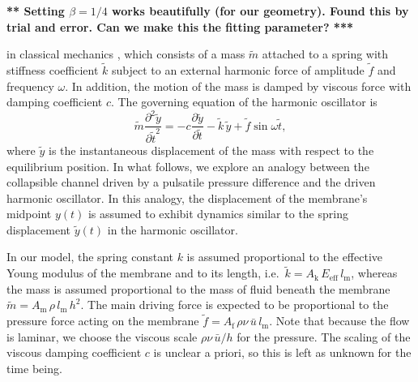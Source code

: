\documentclass[aps,prl,reprint,superscriptaddress,floatfix]{revtex4-1}
\begin{document}
{\bf *** Setting $\beta =  1/4$ works beautifully (for our geometry).
  Found this by trial and error. Can we make this the fitting
  parameter? ***}
\newpage



in classical mechanics \cite{Shabana91}, which consists of a mass $\widetilde{m}$ attached to a spring with stiffness coefficient $\widetilde{k}$ subject to an external harmonic force of amplitude $\widetilde f$ and frequency $\omega$. In addition, the motion of the mass is damped by viscous force with damping coefficient $c$. The governing equation of the harmonic oscillator is
\begin{equation}
\widetilde m\frac{\partial^2 \widetilde y}{\partial {\widetilde t}^2}=-c\frac{\partial \widetilde y}{\partial \widetilde t}-\widetilde k\,\widetilde y+\widetilde f\sin  \omega \widetilde t,
\label{eq:oscillator_eqn}
\end{equation}	
where $\widetilde y$ is the instantaneous displacement of the mass with respect to the equilibrium position. In what follows, we explore an analogy between the collapsible channel driven by a pulsatile pressure difference and the driven harmonic oscillator. In this analogy, the displacement of the membrane's midpoint $y(t)$ is assumed to exhibit dynamics similar to the spring displacement $\widetilde y(t)$ in the harmonic oscillator. 

In our model, the spring constant $k$ is assumed proportional to the effective Young modulus of the membrane and to its length, i.e.~$\tilde k=A_\text{k}\, E_\text{eff}\,l_\text{m}$, whereas the mass is assumed proportional to the mass of fluid beneath the membrane $\tilde m=A_\text{m}\, \rho\, l_\text{m}\, h^2$. The main driving force is expected to be proportional to the pressure force acting on the membrane $\tilde f=A_\text{f}\,\rho\nu\, \bar{u}\, l_\text{m}$. Note that because the flow is laminar, we choose the viscous scale $\rho\nu\, \bar{u}/h$ for the pressure. The scaling of the viscous damping coefficient $c$ is unclear a priori, so this is left as unknown for the time being. 
\end{document}
